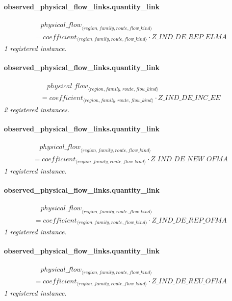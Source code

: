 \documentclass[11pt]{article}
\begin{document}
\paragraph{observed\_physical\_flow\_links.quantity\_link}
\begin{align*}
&\quad {physical\_flow}_{\langle region, family, route, flow\_kind\rangle}\\
&= coefficient_{\langle region, family, route, flow\_kind\rangle} \cdot Z\_IND\_DE\_REP\_ELMA
\end{align*}
\noindent\emph{1 registered instance.}\par
\paragraph{observed\_physical\_flow\_links.quantity\_link}
\begin{align*}
&\quad {physical\_flow}_{\langle region, family, route, flow\_kind\rangle}\\
&= coefficient_{\langle region, family, route, flow\_kind\rangle} \cdot Z\_IND\_DE\_INC\_EE
\end{align*}
\noindent\emph{2 registered instances.}\par
\paragraph{observed\_physical\_flow\_links.quantity\_link}
\begin{align*}
&\quad {physical\_flow}_{\langle region, family, route, flow\_kind\rangle}\\
&= coefficient_{\langle region, family, route, flow\_kind\rangle} \cdot Z\_IND\_DE\_NEW\_OFMA
\end{align*}
\noindent\emph{1 registered instance.}\par
\paragraph{observed\_physical\_flow\_links.quantity\_link}
\begin{align*}
&\quad {physical\_flow}_{\langle region, family, route, flow\_kind\rangle}\\
&= coefficient_{\langle region, family, route, flow\_kind\rangle} \cdot Z\_IND\_DE\_REP\_OFMA
\end{align*}
\noindent\emph{1 registered instance.}\par
\paragraph{observed\_physical\_flow\_links.quantity\_link}
\begin{align*}
&\quad {physical\_flow}_{\langle region, family, route, flow\_kind\rangle}\\
&= coefficient_{\langle region, family, route, flow\_kind\rangle} \cdot Z\_IND\_DE\_REU\_OFMA
\end{align*}
\noindent\emph{1 registered instance.}\par
\end{document}
